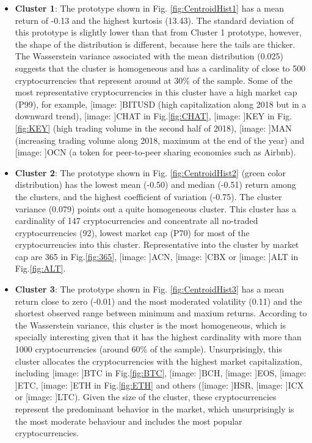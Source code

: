 \documentclass{bmcart}
\def\texttt{[image: ]}
\begin{document}
\begin{itemize}
	\item \textbf{Cluster 1}: The prototype shown in Fig. \ref{fig:CentroidHist1} has a mean return of -0.13 and the highest kurtosis (13.43). The standard deviation of this prototype is slightly lower than that from Cluster 1 prototype, however, the shape of the distribution is different, because here the tails are thicker. The Wasserstein variance associated with the mean distribution (0.025) suggests that the cluster is homogeneous and has a cardinality of close to 500 cryptocurrencies that represent around at 30\% of the sample. Some of the most representative cryptocurrencies in this cluster have a high  market cap (P99), for example, \texttt{BITUSD} (high capitalization along 2018 but in a downward trend), \texttt{CHAT} in Fig.\ref{fig:CHAT}, \texttt{KEY} in Fig.\ref{fig:KEY} (high trading volume in the second half of 2018), \texttt{MAN} (increasing trading volume along 2018, maximum at the end of the year) and \texttt{OCN} (a token for peer-to-peer sharing economies such as Airbnb).
		
	\item \textbf{Cluster 2}: The prototype shown in Fig. \ref{fig:CentroidHist2} (green color distribution) has the lowest mean (-0.50) and median (-0.51) return among the clusters, and the highest coefficient of variation (-0.75). The cluster variance  (0.079) points out a quite homogeneous cluster. This cluster has a cardinality of 147 cryptocurrencies and concentrate all no-traded cryptocurrencies (92), lowest market cap (P70) for most of the cryptocurrencies into this cluster. Representative into the cluster by market cap are 365 in Fig.\ref{fig:365}, \texttt{ACN}, \texttt{CBX} or \texttt{ALT} in Fig.\ref{fig:ALT}. 
	
	\item \textbf{Cluster 3}: The prototype shown in Fig. \ref{fig:CentroidHist3} has a mean return close to zero (-0.01) and the most moderated volatility (0.11) and the shortest observed range between minimum and maxium returns. According to the Wasserstein variance, this cluster is the most homogeneous, which is specially interesting given that it has the highest cardinality with more than 1000 cryptocurrencies (around 60\% of the sample).  Unsurprisingly, this cluster allocates the cryptocurrencies with the highest market capitalization, including \texttt{BTC} in Fig.\ref{fig:BTC}, \texttt{BCH}, \texttt{EOS}, \texttt{ETC}, \texttt{ETH} in Fig.\ref{fig:ETH} and others (\texttt{HSR}, \texttt{ICX} or \texttt{LTC}). Given the size of the cluster, these cryptocurrencies represent the predominant behavior in the market, which unsurprisingly is the most moderate behaviour and includes the most popular cryptocurrencies. 
	

\end{itemize}
\end{document}
